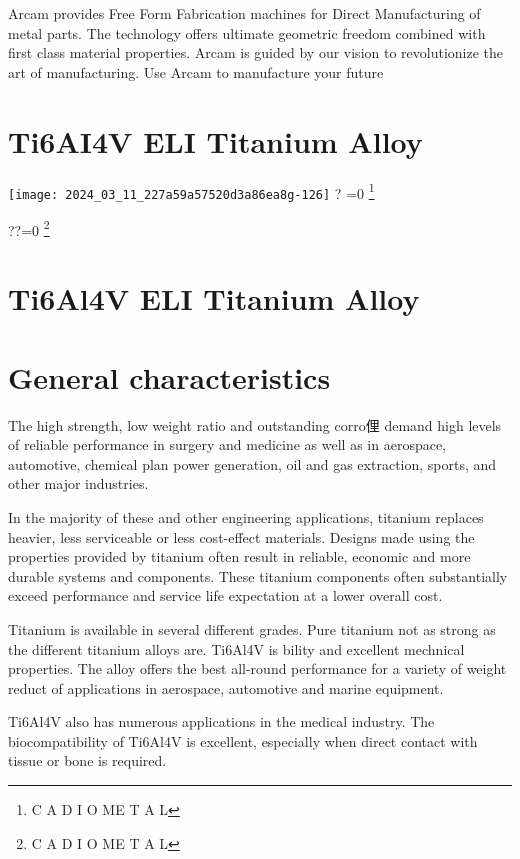 \documentclass[10pt]{article}
\let\svthefootnote\thefootnote
\newcommand\blfootnotetext[1]{%
  \let\thefootnote\relax\footnote{#1}%
  \addtocounter{footnote}{-1}%
  \let\thefootnote\svthefootnote%
}
\let\svfootnotetext\footnotetext
\renewcommand\footnotetext[2][?]{%
  \if\relax#1\relax%
    \ifnum\value{footnote}=0\blfootnotetext{#2}\else\svfootnotetext{#2}\fi%
  \else%
    \if?#1\ifnum\value{footnote}=0\blfootnotetext{#2}\else\svfootnotetext{#2}\fi%
    \else\svfootnotetext[#1]{#2}\fi%
  \fi
}
\begin{document}
Arcam provides Free Form Fabrication machines for Direct Manufacturing of metal parts. The technology offers ultimate geometric freedom combined with first class material properties. Arcam is guided by our vision to revolutionize the art of manufacturing. Use Arcam to manufacture your future

\section*{Ti6AI4V ELI Titanium Alloy}
\texttt{[image: 2024\_03\_11\_227a59a57520d3a86ea8g-126]}

\section*{Ti6Al4V ELI Titanium Alloy}
\section*{General characteristics}
The high strength, low weight ratio and outstanding corro俚 demand high levels of reliable performance in surgery and medicine as well as in aerospace, automotive, chemical plan power generation, oil and gas extraction, sports, and other major industries.

In the majority of these and other engineering applications, titanium replaces heavier, less serviceable or less cost-effect materials. Designs made using the properties provided by titanium often result in reliable, economic and more durable systems and components. These titanium components often substantially exceed performance and service life expectation at a lower overall cost.

Titanium is available in several different grades. Pure titanium not as strong as the different titanium alloys are. Ti6Al4V is bility and excellent mechnical properties. The alloy offers the best all-round performance for a variety of weight reduct of applications in aerospace, automotive and marine equipment.

Ti6Al4V also has numerous applications in the medical industry. The biocompatibility of Ti6Al4V is excellent, especially when direct contact with tissue or bone is required.
\end{document}
